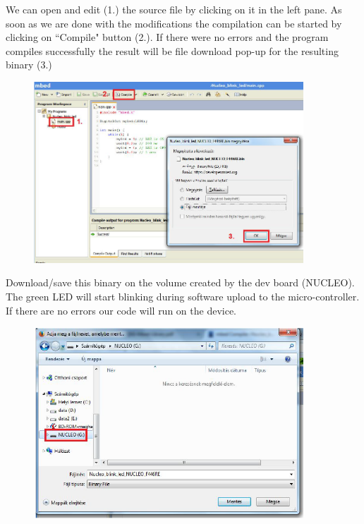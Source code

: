 \documentclass[a4paper]{article}
\begin{document}
We can open and edit (1.) the source file by clicking on it in the left pane. As soon as we are done with the modifications the compilation can be started by clicking on ``Compile" button (2.). If there were no errors and the program compiles successfully the result will be file download pop-up for the resulting binary (3.)

\begin{figure}[H]
    \centering
    \includegraphics[width=0.9\textwidth]{figures/mbed-compile.png}
\end{figure}

Download/save this binary on the volume created by the dev board (NUCLEO). The green LED will start blinking during software upload to the micro-controller. If there are no errors our code will run on the device.

\begin{figure}[H]
    \centering
    \includegraphics[width=0.9\textwidth]{figures/mbed-nucleo-save.png}
\end{figure}
\end{document}
